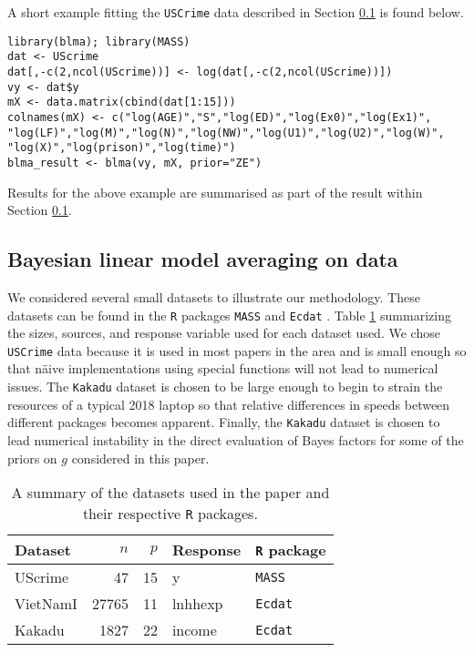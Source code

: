 {A short example fitting the {\tt USCrime} data described in Section
\ref{sec:BLMA} is found below.

\begin{verbatim}
library(blma); library(MASS)
dat <- UScrime
dat[,-c(2,ncol(UScrime))] <- log(dat[,-c(2,ncol(UScrime))])
vy <- dat$y
mX <- data.matrix(cbind(dat[1:15]))
colnames(mX) <- c("log(AGE)","S","log(ED)","log(Ex0)","log(Ex1)",
"log(LF)","log(M)","log(N)","log(NW)","log(U1)","log(U2)","log(W)",
"log(X)","log(prison)","log(time)") 
blma_result <- blma(vy, mX, prior="ZE")
\end{verbatim}

\noindent Results for the above example are summarised as part of the result
within Section \ref{sec:BLMA}.

\subsection{Bayesian linear model averaging on data}\label{sec:BLMA}

We considered several small datasets to illustrate our methodology. These
datasets can be found in the {\tt R} packages {\tt MASS} \citep{Venables2002}
and {\tt Ecdat} \citep{Croissant2016}. Table \ref{tab:g_prior_datasets}
summarizing the sizes,  sources, and response variable used for each dataset
used.  We chose {\tt USCrime} data because it is used in most papers in the
area and is small enough so that n\"aive implementations using special
functions will not lead to numerical issues. The 
{\tt Kakadu} dataset is chosen to be large enough to begin to strain the
resources of a typical 2018 laptop so that relative differences in speeds
between different packages becomes apparent. Finally, the {\tt Kakadu} dataset
is chosen to lead numerical instability in the direct evaluation of Bayes
factors for some of the priors on $g$ considered in this paper.

\begin{table}[h]
	\begin{center}
		\begin{tabular}{l|r|r|l|l}
			Dataset	& $n$ & $p$ & Response & {\tt R} package \\ 
			\hline 
			UScrime 	& 47 & 15 & y & {\tt MASS} \\  
			VietNamI	& 27765 & 11 & lnhhexp & {\tt Ecdat}  \\ 
			Kakadu	& 1827 & 22 & income & {\tt Ecdat}   \\  
		\end{tabular} 
	\end{center}
	\caption{A summary of the datasets used in the paper and their respective {\tt R} packages.}
	\label{tab:g_prior_datasets}
\end{table}

}
